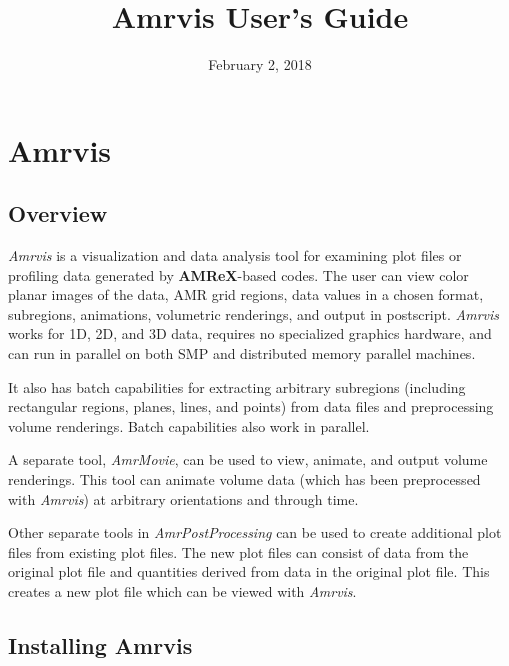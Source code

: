 \documentclass{article}
\title{Amrvis User's Guide}
\date{February 2, 2018}
\begin{document}
\maketitle

\section{Amrvis}

\subsection{Overview}

{\em Amrvis} is a visualization and data analysis tool for
examining plot files or profiling data generated by {\bf AMReX}-based codes.  
The user can view color planar images of the data,
AMR grid regions, data values in a chosen format, subregions, animations,
volumetric renderings, and output in postscript.  {\em Amrvis} works
for 1D, 2D, and 3D data, requires no specialized graphics hardware, and
can run in parallel on both SMP and distributed memory parallel machines.

It also has batch capabilities for extracting arbitrary subregions
(including rectangular regions, planes, lines, and points) from data files and
preprocessing volume renderings.  Batch capabilities also work in parallel.

A separate tool, {\em AmrMovie}, can be used to view, animate, and output volume
renderings.  This tool can animate volume data (which has been preprocessed
with {\em Amrvis}) at arbitrary orientations and through time.

Other separate tools in {\em AmrPostProcessing} can be used to create additional
plot files from existing plot files.  The new plot files can consist of
data from the original plot file and quantities derived from data in 
the original plot file.  This creates a new plot file which can be
viewed with {\em Amrvis}.

\subsection{Installing Amrvis}
\end{document}
